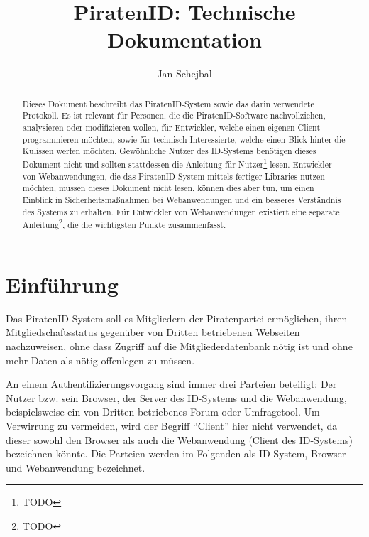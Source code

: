 \documentclass[parskip=half]{scrartcl}
\title{PiratenID: Technische Dokumentation}
\author{Jan Schejbal}
\date{}
\begin{document}
\maketitle

\begin{abstract}Dieses Dokument beschreibt das PiratenID-System sowie das darin verwendete Protokoll.
Es ist relevant für Personen, die die PiratenID-Software nachvollziehen, analysieren oder modifizieren wollen,
für Entwickler, welche einen eigenen Client programmieren möchten, sowie für technisch Interessierte, welche einen Blick hinter die Kulissen werfen möchten.
Gewöhnliche Nutzer des ID-Systems benötigen dieses Dokument nicht und sollten stattdessen die Anleitung für Nutzer\footnote{TODO} lesen.
Entwickler von Webanwendungen, die das PiratenID-System mittels fertiger Libraries nutzen möchten, müssen dieses Dokument nicht lesen,
können dies aber tun, um einen Einblick in Sicherheitsmaßnahmen bei Webanwendungen und ein besseres Verständnis des Systems zu erhalten.
Für Entwickler von Webanwendungen existiert eine separate Anleitung\footnote{TODO}, die die wichtigsten Punkte zusammenfasst.
\end{abstract}

\newpage

\tableofcontents

\newpage

\section{Einführung}
Das PiratenID-System soll es Mitgliedern der Piratenpartei ermöglichen, ihren Mitgliedschaftsstatus gegenüber von Dritten betriebenen Webseiten nachzuweisen,
ohne dass Zugriff auf die Mitgliederdatenbank nötig ist und ohne mehr Daten als nötig offenlegen zu müssen.

An einem Authentifizierungsvorgang sind immer drei Parteien beteiligt: Der Nutzer bzw. sein Browser, der Server des ID-Systems und die Webanwendung,
beispielsweise ein von Dritten betriebenes Forum oder Umfragetool.
Um Verwirrung zu vermeiden, wird der Begriff "`Client"' hier nicht verwendet, da dieser sowohl den Browser als auch die Webanwendung (Client des ID-Systems) bezeichnen könnte.
Die Parteien werden im Folgenden als ID-System, Browser und Webanwendung bezeichnet.
\end{document}
